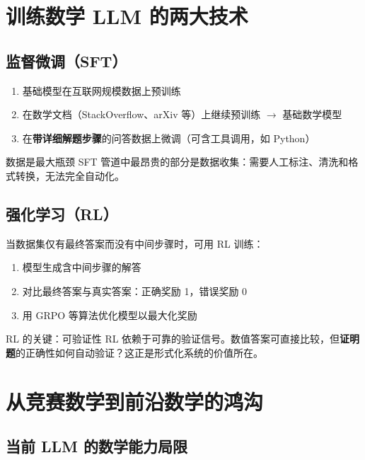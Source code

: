 \documentclass[a4paper]{article}
\begin{document}
\section{训练数学 LLM 的两大技术}

\subsection{监督微调（SFT）}

\begin{enumerate}
    \item 基础模型在互联网规模数据上预训练
    \item 在数学文档（StackOverflow、arXiv 等）上继续预训练 $\to$ 基础数学模型
    \item 在\textbf{带详细解题步骤}的问答数据上微调（可含工具调用，如 Python）
\end{enumerate}

\begin{warningbox}{数据是最大瓶颈}
SFT 管道中最昂贵的部分是数据收集：需要人工标注、清洗和格式转换，无法完全自动化。
\end{warningbox}

\subsection{强化学习（RL）}

当数据集仅有最终答案而没有中间步骤时，可用 RL 训练：
\begin{enumerate}
    \item 模型生成含中间步骤的解答
    \item 对比最终答案与真实答案：正确奖励 1，错误奖励 0
    \item 用 GRPO 等算法优化模型以最大化奖励
\end{enumerate}

\begin{importantbox}{RL 的关键：可验证性}
RL 依赖于可靠的验证信号。数值答案可直接比较，但\textbf{证明题}的正确性如何自动验证？这正是形式化系统的价值所在。
\end{importantbox}

\section{从竞赛数学到前沿数学的鸿沟}

\subsection{当前 LLM 的数学能力局限}
\end{document}
